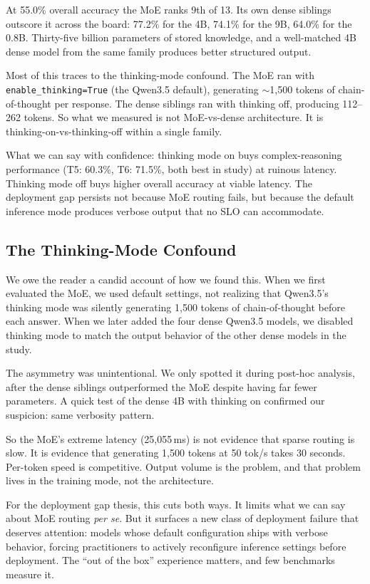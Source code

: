 \documentclass[11pt]{article}
\begin{document}
At 55.0\% overall accuracy the MoE ranks 9th of 13.  Its own dense siblings outscore it across the board: 77.2\% for the 4B, 74.1\% for the 9B, 64.0\% for the 0.8B.  Thirty-five billion parameters of stored knowledge, and a well-matched 4B dense model from the same family produces better structured output.

Most of this traces to the thinking-mode confound.  The MoE ran with \texttt{enable\_thinking=True} (the Qwen3.5 default), generating ${\sim}$1,500 tokens of chain-of-thought per response.  The dense siblings ran with thinking off, producing 112--262 tokens.  So what we measured is not MoE-vs-dense architecture.  It is thinking-on-vs-thinking-off within a single family.

What we can say with confidence: thinking mode on buys complex-reasoning performance (T5: 60.3\%, T6: 71.5\%, both best in study) at ruinous latency.  Thinking mode off buys higher overall accuracy at viable latency.  The deployment gap persists not because MoE routing fails, but because the default inference mode produces verbose output that no SLO can accommodate.

\subsection{The Thinking-Mode Confound}

We owe the reader a candid account of how we found this.  When we first evaluated the MoE, we used default settings, not realizing that Qwen3.5's thinking mode was silently generating 1,500 tokens of chain-of-thought before each answer.  When we later added the four dense Qwen3.5 models, we disabled thinking mode to match the output behavior of the other dense models in the study.

The asymmetry was unintentional.  We only spotted it during post-hoc analysis, after the dense siblings outperformed the MoE despite having far fewer parameters.  A quick test of the dense 4B with thinking on confirmed our suspicion: same verbosity pattern.

So the MoE's extreme latency (25,055\,ms) is not evidence that sparse routing is slow.  It is evidence that generating 1,500 tokens at 50 tok/s takes 30 seconds.  Per-token speed is competitive.  Output volume is the problem, and that problem lives in the training mode, not the architecture.

For the deployment gap thesis, this cuts both ways.  It limits what we can say about MoE routing \emph{per se}.  But it surfaces a new class of deployment failure that deserves attention: models whose default configuration ships with verbose behavior, forcing practitioners to actively reconfigure inference settings before deployment.  The ``out of the box'' experience matters, and few benchmarks measure it.
\end{document}

